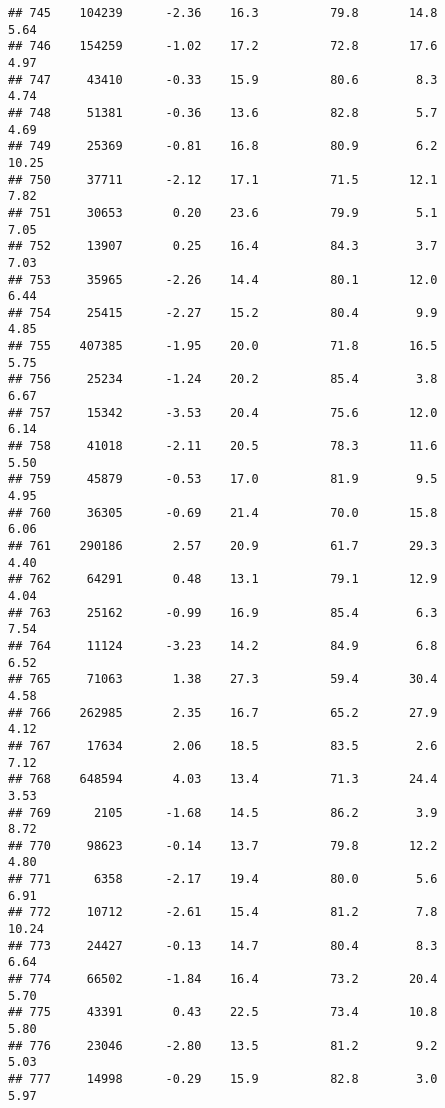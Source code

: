 \documentclass[
]{article}
\begin{document}
\begin{verbatim}
## 745    104239      -2.36    16.3          79.8       14.8              5.64
## 746    154259      -1.02    17.2          72.8       17.6              4.97
## 747     43410      -0.33    15.9          80.6        8.3              4.74
## 748     51381      -0.36    13.6          82.8        5.7              4.69
## 749     25369      -0.81    16.8          80.9        6.2             10.25
## 750     37711      -2.12    17.1          71.5       12.1              7.82
## 751     30653       0.20    23.6          79.9        5.1              7.05
## 752     13907       0.25    16.4          84.3        3.7              7.03
## 753     35965      -2.26    14.4          80.1       12.0              6.44
## 754     25415      -2.27    15.2          80.4        9.9              4.85
## 755    407385      -1.95    20.0          71.8       16.5              5.75
## 756     25234      -1.24    20.2          85.4        3.8              6.67
## 757     15342      -3.53    20.4          75.6       12.0              6.14
## 758     41018      -2.11    20.5          78.3       11.6              5.50
## 759     45879      -0.53    17.0          81.9        9.5              4.95
## 760     36305      -0.69    21.4          70.0       15.8              6.06
## 761    290186       2.57    20.9          61.7       29.3              4.40
## 762     64291       0.48    13.1          79.1       12.9              4.04
## 763     25162      -0.99    16.9          85.4        6.3              7.54
## 764     11124      -3.23    14.2          84.9        6.8              6.52
## 765     71063       1.38    27.3          59.4       30.4              4.58
## 766    262985       2.35    16.7          65.2       27.9              4.12
## 767     17634       2.06    18.5          83.5        2.6              7.12
## 768    648594       4.03    13.4          71.3       24.4              3.53
## 769      2105      -1.68    14.5          86.2        3.9              8.72
## 770     98623      -0.14    13.7          79.8       12.2              4.80
## 771      6358      -2.17    19.4          80.0        5.6              6.91
## 772     10712      -2.61    15.4          81.2        7.8             10.24
## 773     24427      -0.13    14.7          80.4        8.3              6.64
## 774     66502      -1.84    16.4          73.2       20.4              5.70
## 775     43391       0.43    22.5          73.4       10.8              5.80
## 776     23046      -2.80    13.5          81.2        9.2              5.03
## 777     14998      -0.29    15.9          82.8        3.0              5.97

\end{verbatim}
\end{document}
